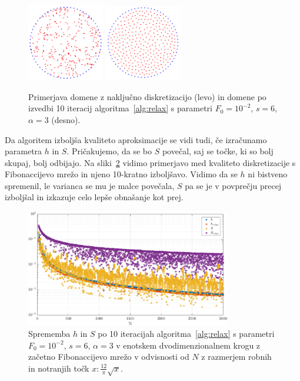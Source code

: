 \documentclass[12pt,a4paper]{article}
\theoremstyle{definition} %
\theoremstyle{plain} %
\numberwithin{equation}{section}
\begin{document}
\begin{figure}[!ht]
  \centering
  \includegraphics[width=0.3\textwidth]{images/domain_circle.png}
  \hspace{1em}
  \includegraphics[width=0.3\textwidth]{images/domain_circle_relaxed.png}
  \caption{Primerjava domene z naključno diskretizacijo (levo) in domene po
  izvedbi 10 iteracij algoritma~\ref{alg:relax} s parametri $F_0 = 10^{-2}$, $s
  = 6$, $\alpha = 3$ (desno).}
  \label{fig:relax-circle}
\end{figure}

Da algoritem izboljša kvaliteto aproksimacije se vidi tudi, če izračunamo
parametra $h$ in $S$. Pričakujemo, da se bo $S$ povečal, saj se točke, ki so
bolj skupaj, bolj odbijajo. Na sliki~\ref{fig:relax-hs} vidimo primerjavo med
kvaliteto diskretizacije s Fibonaccijevo mrežo in njeno 10-kratno izboljšavo.
Vidimo da se $h$ ni bistveno spremenil, le varianca se mu je malce povečala,
$S$ pa se je v povprečju precej izboljšal in izkazuje celo lepše obnašanje kot
prej.

\begin{figure}[ht]
  \centering
  \includegraphics[width=0.8\textwidth]{images/relax_improvement.pdf}
  \caption{Sprememba $h$ in $S$ po 10 iteracijah algoritma~\ref{alg:relax} s
  parametri $F_0 = 10^{-2}$, $s = 6$, $\alpha = 3$ v enotskem dvodimenzionalnem
  krogu z začetno Fibonaccijevo mrežo v odvisnosti od $N$ z razmerjem robnih in
  notranjih točk $x : \frac{12}{\pi} \sqrt{x}$.}
  \label{fig:relax-hs}
\end{figure}
\end{document}

